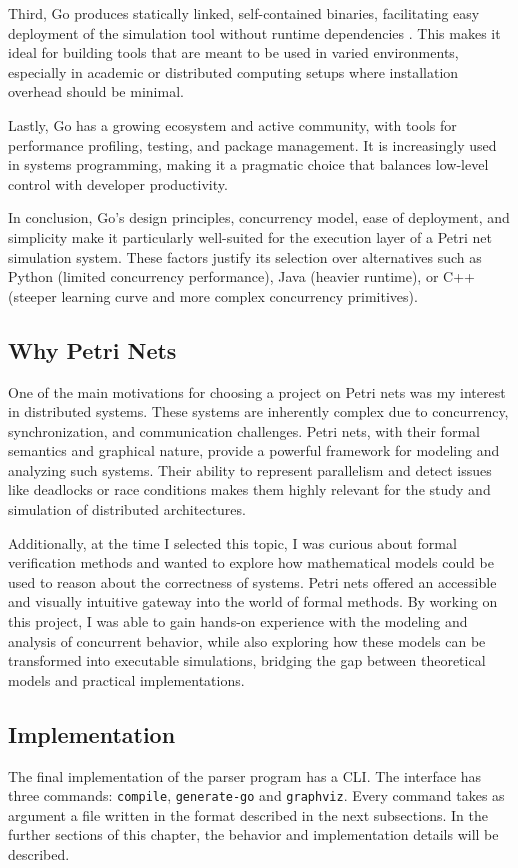 \documentclass[12pt]{article}
\begin{document}
    Third, Go produces statically linked, self-contained binaries, facilitating easy deployment of the simulation tool without runtime dependencies \cite{pike2012go}. This makes it ideal for building tools that are meant to be used in varied environments, especially in academic or distributed computing setups where installation overhead should be minimal.

    Lastly, Go has a growing ecosystem and active community, with tools for performance profiling, testing, and package management. It is increasingly used in systems programming, making it a pragmatic choice that balances low-level control with developer productivity.

    In conclusion, Go's design principles, concurrency model, ease of deployment, and simplicity make it particularly well-suited for the execution layer of a Petri net simulation system. These factors justify its selection over alternatives such as Python (limited concurrency performance), Java (heavier runtime), or C++ (steeper learning curve and more complex concurrency primitives).

    \subsection{Why Petri Nets}
    One of the main motivations for choosing a project on Petri nets was my interest in distributed systems. These systems are inherently complex due to concurrency, synchronization, and communication challenges. Petri nets, with their formal semantics and graphical nature, provide a powerful framework for modeling and analyzing such systems. Their ability to represent parallelism and detect issues like deadlocks or race conditions makes them highly relevant for the study and simulation of distributed architectures.

    Additionally, at the time I selected this topic, I was curious about formal verification methods and wanted to explore how mathematical models could be used to reason about the correctness of systems. Petri nets offered an accessible and visually intuitive gateway into the world of formal methods. By working on this project, I was able to gain hands-on experience with the modeling and analysis of concurrent behavior, while also exploring how these models can be transformed into executable simulations, bridging the gap between theoretical models and practical implementations.

    \subsection{Implementation}
        The final implementation of the parser program has a CLI. The interface has three commands: \texttt{compile}, \texttt{generate-go} and \texttt{graphviz}. Every command takes as argument a file written in the format described in the next subsections. In the further sections of this chapter, the behavior and implementation details will be described.
\end{document}
